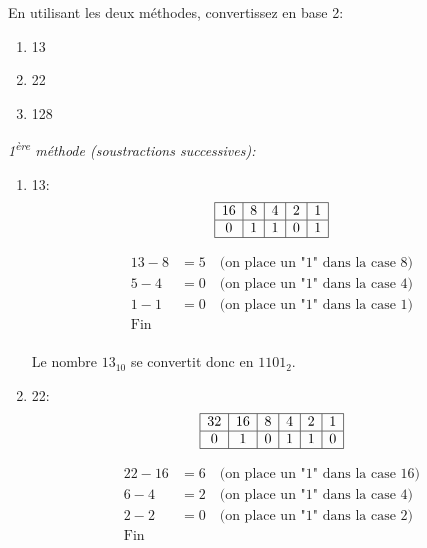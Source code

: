 \documentclass[12pt]{article}
\newenvironment{MaReponse}
		{\begin{greyedtextbox}\itshape} %
		{\end{greyedtextbox}}            %
\newenvironment{alphenum}
{\begin{enumerate}[label=\alph*.]}
	{\end{enumerate}}
\begin{document}
	\begin{MonExo}
		En utilisant les deux méthodes, convertissez en base 2:
		\begin{alphenum}
			\item 13
			\item 22
			\item 128
		\end{alphenum}
	\end{MonExo}
	\begin{MaReponse}
		1\textsuperscript{ère} méthode (soustractions successives):
		\begin{alphenum}
			\item 13:
				\[
				\begin{array}{|c|c|c|c|c|c|c|}
					\hline
					16 & 8 & 4 & 2 & 1 \\
					\hline
					0 & 1 & 1 & 0 & 1 \\
					\hline
				\end{array}
				\]
				
				\[
				\begin{array}{ll}
					13 - 8 &= 5 \quad \text{(on place un "1" dans la case \(8\))} \\
					5 - 4 &= 0 \quad \text{(on place un "1" dans la case \(4\))} \\
					1 - 1 &= 0 \quad \text{(on place un "1" dans la case \(1\))} \\
					\text{Fin} & \\
				\end{array}
				\]
				
				Le nombre \(13_{10}\) se convertit donc en \(1101_{2}\).
			\item 22:
				\[
				\begin{array}{|c|c|c|c|c|c|c|c|}
					\hline
					32 & 16 & 8 & 4 & 2 & 1 \\
					\hline
					0 & 1 & 0 & 1 & 1 &0\\
					\hline
				\end{array}
				\]
				
				\[
				\begin{array}{ll}
					22 - 16 &= 6 \quad \text{(on place un "1" dans la case \(16\))} \\
					6 - 4 &= 2 \quad \text{(on place un "1" dans la case \(4\))} \\
					2 - 2 &= 0 \quad \text{(on place un "1" dans la case \(2\))} \\
					\text{Fin} & \\
				\end{array}
				\]
				

\end{alphenum}
\end{MaReponse}
\end{document}
